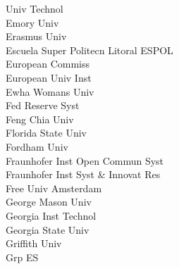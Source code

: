 \documentclass[a4paper]{article}
\begin{document}
\begin{multicols*}{2}
\begin{footnotesize}
 Univ Technol \\ Emory Univ \\ Erasmus Univ \\ Escuela Super Politecn Litoral ESPOL \\ European Commiss \\ European Univ Inst \\ Ewha Womans Univ \\ Fed Reserve Syst \\ Feng Chia Univ \\ Florida State Univ \\ Fordham Univ \\ Fraunhofer Inst Open Commun Syst \\ Fraunhofer Inst Syst \& Innovat Res \\ Free Univ Amsterdam \\ George Mason Univ \\ Georgia Inst Technol \\ Georgia State Univ \\ Griffith Univ \\ Grp ES
\end{footnotesize}
\end{multicols*}
\end{document}
